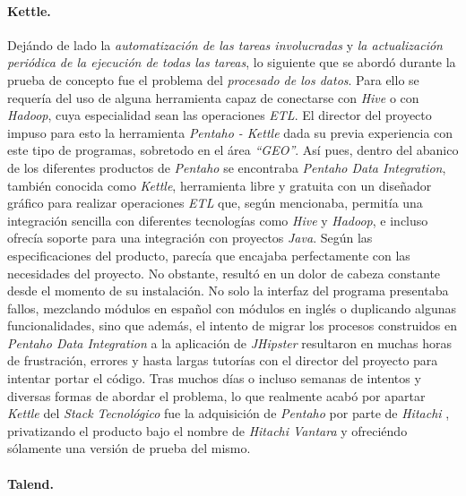 \bigskip
\par
\paragraph*{Kettle.}

\par
Dejándo de lado la \textit{automatización de las tareas involucradas} y \textit{la actualización periódica de la ejecución de todas las tareas}, lo siguiente que se abordó durante la prueba de concepto fue el problema del \textit{procesado de los datos}. Para ello se requería del uso de alguna herramienta capaz de conectarse con \textit{Hive} o con \textit{Hadoop}, cuya especialidad sean las operaciones \textit{ETL}. El director del proyecto impuso para esto la herramienta \textit{Pentaho - Kettle} \cite{kettle} dada su previa experiencia con este tipo de programas, sobretodo en el área \textit{``GEO''}. Así pues, dentro del abanico de los diferentes productos de \textit{Pentaho} \cite{pentaho} se encontraba \textit{Pentaho Data Integration}, también conocida como \textit{Kettle}, herramienta libre y gratuita con un diseñador gráfico para realizar operaciones \textit{ETL} que, según mencionaba, permitía una integración sencilla con diferentes tecnologías como \textit{Hive} y \textit{Hadoop}, e incluso ofrecía soporte para una integración con proyectos \textit{Java}. Según las especificaciones del producto, parecía que encajaba perfectamente con las necesidades del proyecto. No obstante, resultó en un dolor de cabeza constante desde el momento de su instalación. No solo la interfaz del programa presentaba fallos, mezclando módulos en español con módulos en inglés o duplicando algunas funcionalidades, sino que además, el intento de migrar los procesos construidos en \textit{Pentaho Data Integration} a la aplicación de \textit{JHipster} resultaron en muchas horas de frustración, errores y hasta largas tutorías con el director del proyecto para intentar portar el código. Tras muchos días o incluso semanas de intentos y diversas formas de abordar el problema, lo que realmente acabó por apartar \textit{Kettle} del \textit{Stack Tecnológico} fue la adquisición de \textit{Pentaho} por parte de \textit{Hitachi} \cite{hitachi}, privatizando el producto bajo el nombre de \textit{Hitachi Vantara} \cite{hitachivantara} y ofreciéndo sólamente una versión de prueba del mismo. 


\bigskip
\par
\paragraph*{Talend.}

